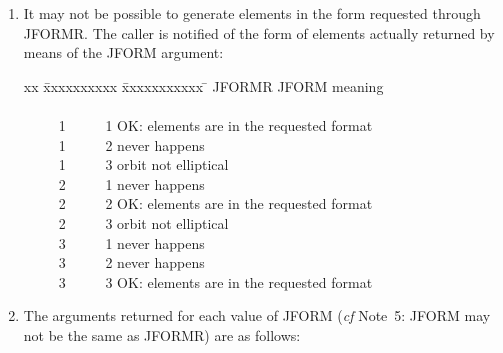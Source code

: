 \documentclass[11pt,twoside]{article}
\begin{document}
{\begin{enumerate}
        JFORM=3, suitable for comets:

        \begin{tabbing}
        xxx \= xxxxxxxx \= xx \= \kill
        \> EPOCH  \> = \> epoch of perihelion $T$ (TT MJD) \\
        \> ORBINC \> = \> inclination $i$ (radians) \\
        \> ANODE  \> = \> longitude of the ascending node $\Omega$ (radians) \\
        \> PERIH  \> = \> argument of perihelion $\omega$ (radians) \\
        \> AORQ   \> = \> perihelion distance $q$ (AU) \\
        \> E      \> = \> eccentricity $e$ $( 0 \leq e \leq 10 )$
        \end{tabbing}
  \item It may not be possible to generate elements in the form
        requested through JFORMR.  The caller is notified of the form
        of elements actually returned by means of the JFORM argument:

        \begin{tabbing}
        xx \= xxxxxxxxxx \= xxxxxxxxxxx \= \kill
        \> JFORMR   \> JFORM   \> meaning \\ \\
        \> ~~~~~1   \> ~~~~~1  \> OK: elements are in the requested format \\
        \> ~~~~~1   \> ~~~~~2  \> never happens \\
        \> ~~~~~1   \> ~~~~~3  \> orbit not elliptical \\
        \> ~~~~~2   \> ~~~~~1  \> never happens \\
        \> ~~~~~2   \> ~~~~~2  \> OK: elements are in the requested format \\
        \> ~~~~~2   \> ~~~~~3  \> orbit not elliptical \\
        \> ~~~~~3   \> ~~~~~1  \> never happens \\
        \> ~~~~~3   \> ~~~~~2  \> never happens \\
        \> ~~~~~3   \> ~~~~~3  \> OK: elements are in the requested format
        \end{tabbing}
  \item The arguments returned for each value of JFORM ({\it cf}\/ Note~5:
        JFORM may not be the same as JFORMR) are as follows:


\end{enumerate}}
\end{document}
